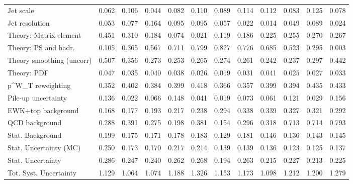 \begin{tabular}{l|p{0.6cm}p{0.6cm}p{0.6cm}p{0.6cm}p{0.6cm}p{0.6cm}p{0.6cm}p{0.6cm}p{0.6cm}p{0.6cm}p{0.6cm}}
Jet scale                                & 0.062 & 0.106 & 0.044 & 0.082 & 0.110 & 0.089 & 0.114 & 0.112 & 0.083 & 0.125 & 0.078 \\
Jet resolution                           & 0.053 & 0.077 & 0.164 & 0.095 & 0.095 & 0.057 & 0.022 & 0.014 & 0.049 & 0.089 & 0.024 \\
Theory: Matrix element                   & 0.451 & 0.310 & 0.184 & 0.074 & 0.021 & 0.119 & 0.186 & 0.225 & 0.255 & 0.270 & 0.267 \\
Theory: PS and hadr.                     & 0.105 & 0.365 & 0.567 & 0.711 & 0.799 & 0.827 & 0.776 & 0.685 & 0.523 & 0.295 & 0.003 \\
Theory smoothing (uncorr)                & 0.507 & 0.356 & 0.273 & 0.253 & 0.265 & 0.274 & 0.261 & 0.242 & 0.237 & 0.297 & 0.442 \\
Theory: PDF                              & 0.047 & 0.035 & 0.040 & 0.038 & 0.026 & 0.019 & 0.031 & 0.041 & 0.025 & 0.027 & 0.033 \\
p^{W}_{T} reweighting                    & 0.352 & 0.402 & 0.384 & 0.399 & 0.418 & 0.366 & 0.357 & 0.399 & 0.394 & 0.435 & 0.433 \\
Pile-up uncertainty                      & 0.136 & 0.022 & 0.066 & 0.148 & 0.041 & 0.019 & 0.073 & 0.061 & 0.121 & 0.029 & 0.156 \\
EWK+top background                       & 0.168 & 0.177 & 0.193 & 0.217 & 0.238 & 0.294 & 0.338 & 0.339 & 0.327 & 0.321 & 0.292 \\
QCD background                           & 0.288 & 0.391 & 0.275 & 0.198 & 0.381 & 0.154 & 0.296 & 0.318 & 0.713 & 0.714 & 0.793 \\
Stat. Background                         & 0.199 & 0.175 & 0.171 & 0.178 & 0.183 & 0.129 & 0.181 & 0.146 & 0.136 & 0.143 & 0.145 \\
Stat. Uncertainty (MC)                   & 0.250 & 0.173 & 0.170 & 0.217 & 0.214 & 0.139 & 0.139 & 0.136 & 0.123 & 0.125 & 0.137 \\
\hline
Stat. Uncertainty                        & 0.286 & 0.247 & 0.240 & 0.262 & 0.268 & 0.194 & 0.263 & 0.215 & 0.227 & 0.213 & 0.225 \\
\hline
Tot. Syst. Uncertainty                   & 1.129 & 1.064 & 1.074 & 1.188 & 1.326 & 1.153 & 1.173 & 1.098 & 1.212 & 1.200 & 1.279 \\
\hline
\end{tabular}
